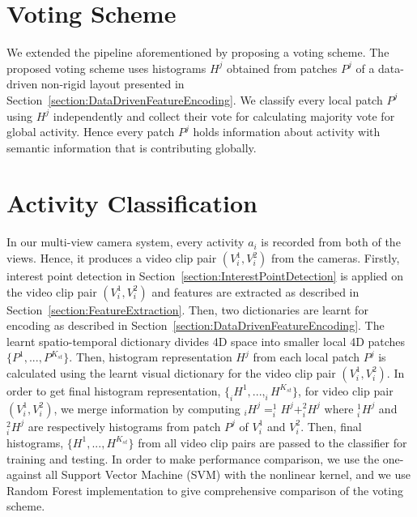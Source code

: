\section{Voting Scheme}
\label{section:VotingScheme}
We extended the pipeline aforementioned by proposing a voting scheme. The proposed voting scheme uses histograms $H^{j}$ obtained from patches $P^{j}$ of a data-driven non-rigid layout presented in Section~\ref{section:DataDrivenFeatureEncoding}. We classify every local patch $P^{j}$ using $H^{j}$ independently and collect their vote for calculating majority vote for global activity. Hence every patch $P^{j}$ holds information about activity with semantic information that is contributing globally. 

\section{Activity Classification}
\label{section:ActionClassification}

	In our multi-view camera system, every activity $a_{i}$ is recorded from both of the views. Hence, it produces a video clip pair $\left(V_{i}^{1},V_{i}^{2}\right)$ from the cameras. Firstly, interest point detection in Section~\ref{section:InterestPointDetection} is applied on the video clip pair $\left(V_{i}^{1},V_{i}^{2}\right)$ and features are extracted as described in Section~\ref{section:FeatureExtraction}. Then, two dictionaries are learnt for encoding as described in Section~\ref{section:DataDrivenFeatureEncoding}. The learnt spatio-temporal dictionary divides 4D space into smaller local 4D patches $\{P^{1},...,P^{K_{st}}\}$. Then, histogram representation $H^{j}$ from each local patch $P^{j}$ is calculated using the learnt visual dictionary for the video clip pair $\left(V_{i}^{1}, V_{i}^{2}\right)$. In order to get final histogram representation, $\{_{i}H^{1},..., _{i}H^{K_{st}}\}$, for video clip pair $\left(V_{i}^{1},V_{i}^{2}\right)$, we merge information by computing $_{i}H^{j} = _{i}^{1}H^{j} + _{i}^{2}H^{j}$ where $_{i}^{1}H^{j}$ and $_{i}^{2}H^{j}$ are respectively histograms from patch $P^{j}$ of $V_{i}^{1}$ and $V_{i}^{2}$. Then, final histograms, $\{H^{1},..., H^{K_{st}}\}$ from all video clip pairs are passed to the classifier for training and testing. In order to make performance comparison, we use the one-against all Support Vector Machine (SVM) with the nonlinear kernel, and we use Random Forest implementation to give comprehensive comparison of the voting scheme.


